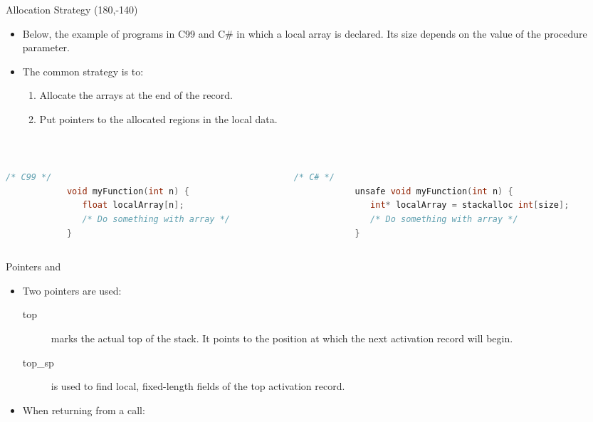 \begin{bibunit}[apalike]
\begin{frame}[fragile]{Allocation Strategy}
	\putat(180,-140){}
	\begin{itemize}
	\item Below, the example of programs in C99 and C\# in which a local array is declared. Its size depends on the value of the procedure parameter.
	\end{itemize}
	\begin{minipage}{.5\linewidth}
	\begin{itemize}
	\item The common strategy is to:
		\begin{enumerate}
		\item Allocate the arrays at the end of the record.
		\item Put pointers to the allocated regions in the local data.
		\end{enumerate}
	\end{itemize}
	\end{minipage} \\
	\vspace{2em}
	\begin{columns}
		\begin{column}{.5\linewidth}
			\begin{lstlisting}[language=c]
			/* C99 */
			void myFunction(int n) {
			   float localArray[n];
			   /* Do something with array */
			}
			\end{lstlisting}
		\end{column}
		\begin{column}{.5\linewidth}
			\begin{lstlisting}[language=c]
			/* C# */
			unsafe void myFunction(int n) {
			   int* localArray = stackalloc int[size];
			   /* Do something with array */
			}
			\end{lstlisting}
		\end{column}
	\end{columns}
\end{frame}

\begin{frame}{Pointers  and }
	\begin{itemize}
	\item Two pointers are used:
		\begin{description}
		\item[top] marks the actual top of the stack. It points to the position at which the next activation record will begin.
		\item[top\_sp] is used to find local, fixed-length fields of the top activation record.
		\end{description}
	\vfill
	\item When returning from a call: \\
	\end{itemize}
	\vfill
	\begin{center}
	\end{center}
\end{frame}


\end{bibunit}
